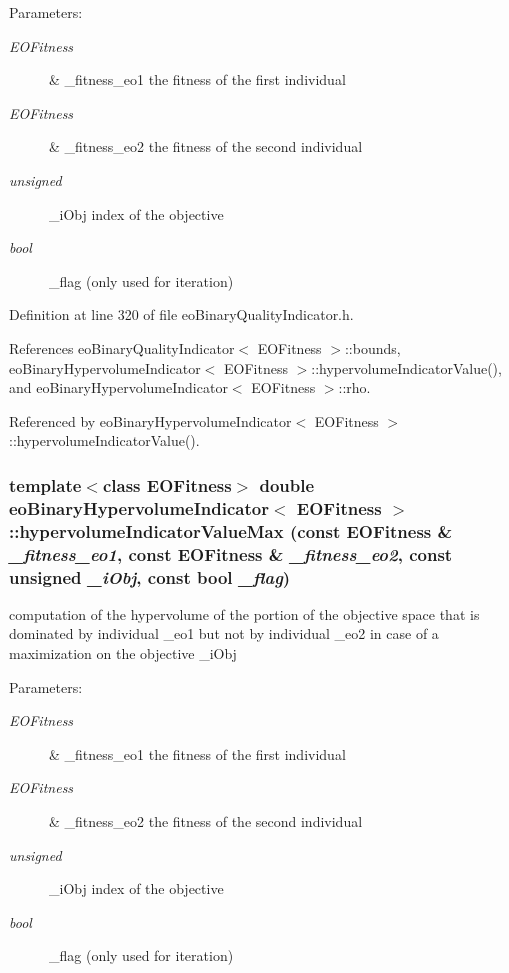 \begin{Desc}
\item[Parameters:]
\begin{description}
\item[{\em EOFitness}]\& \_\-fitness\_\-eo1 the fitness of the first individual \item[{\em EOFitness}]\& \_\-fitness\_\-eo2 the fitness of the second individual \item[{\em unsigned}]\_\-i\-Obj index of the objective \item[{\em bool}]\_\-flag (only used for iteration) \end{description}
\end{Desc}


Definition at line 320 of file eo\-Binary\-Quality\-Indicator.h.

References eo\-Binary\-Quality\-Indicator$<$ EOFitness $>$::bounds, eo\-Binary\-Hypervolume\-Indicator$<$ EOFitness $>$::hypervolume\-Indicator\-Value(), and eo\-Binary\-Hypervolume\-Indicator$<$ EOFitness $>$::rho.

Referenced by eo\-Binary\-Hypervolume\-Indicator$<$ EOFitness $>$::hypervolume\-Indicator\-Value().
\subsubsection{\setlength{\rightskip}{0pt plus 5cm}template$<$class EOFitness$>$ double {\bf eo\-Binary\-Hypervolume\-Indicator}$<$ EOFitness $>$::hypervolume\-Indicator\-Value\-Max (const EOFitness \& {\em \_\-fitness\_\-eo1}, const EOFitness \& {\em \_\-fitness\_\-eo2}, const unsigned {\em \_\-i\-Obj}, const bool {\em \_\-flag})\hspace{0.3cm}{\tt  [inline, private]}}\label{classeoBinaryHypervolumeIndicator_df2903822dbcd0a906dabf4cb6e05bfb}


computation of the hypervolume of the portion of the objective space that is dominated by individual \_\-eo1 but not by individual \_\-eo2 in case of a maximization on the objective \_\-i\-Obj 

\begin{Desc}
\item[Parameters:]
\begin{description}
\item[{\em EOFitness}]\& \_\-fitness\_\-eo1 the fitness of the first individual \item[{\em EOFitness}]\& \_\-fitness\_\-eo2 the fitness of the second individual \item[{\em unsigned}]\_\-i\-Obj index of the objective \item[{\em bool}]\_\-flag (only used for iteration) \end{description}
\end{Desc}


